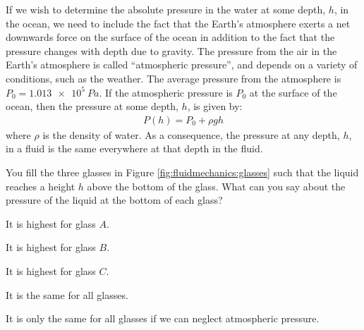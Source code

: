 If we wish to determine the absolute pressure in the water at some depth, $h$, in the ocean, we need to include the fact that the Earth's atmosphere exerts a net downwards force on the surface of the ocean in addition to the fact that the pressure changes with depth due to gravity. The pressure from the air in the Earth's atmosphere is called ``atmospheric pressure'', and depends on a variety of conditions, such as the weather. The average pressure from the atmosphere is $P_0=\SI{1.013e5}{Pa}$. If the atmospheric pressure is $P_0$ at the surface of the ocean, then the pressure at some depth, $h$, is given by:
\begin{align*}
P(h) = P_0 + \rho g h
\end{align*}
where $\rho$ is the density of water. As a consequence, the pressure at any depth, $h$, in a fluid is the same everywhere at that depth in the fluid. 
\newpage
\begin{checkpoint}
\begin{MCquestion}{You fill the three glasses in Figure \ref{fig:fluidmechanics:glasses} such that the liquid reaches a height $h$ above the bottom of the glass. What can you say about the pressure of the liquid at the bottom of each glass?}
\item It is highest for glass $A$.
\item It is highest for glass $B$.
\item It is highest for glass $C$.
\item It is the same for all glasses. \correct
\item It is only the same for all glasses if we can neglect atmospheric pressure. 
\end{MCquestion}
\end{checkpoint}

